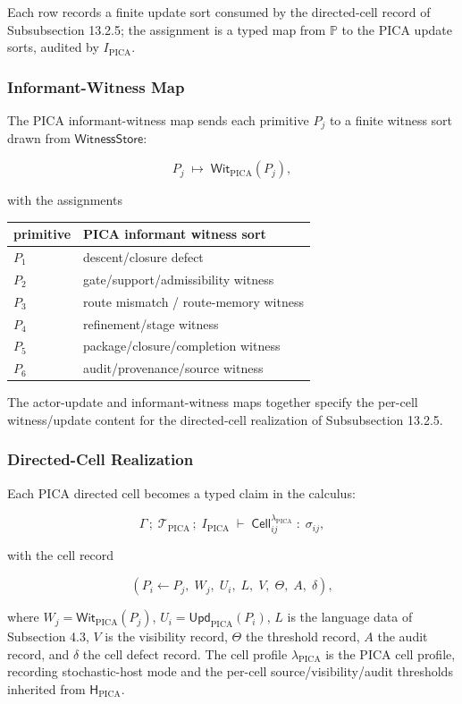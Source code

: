 \documentclass[11pt]{article}
\theoremstyle{definition}
\begin{document}
Each row records a finite update sort consumed by the directed-cell record of Subsubsection 13.2.5; the assignment is a typed map from \(\mathbb P\) to the PICA update sorts, audited by \(I_{\mathrm{PICA}}\).

\subsubsection{Informant-Witness Map}

The PICA informant-witness map sends each primitive \(P_j\) to a finite witness sort drawn from \(\mathsf{WitnessStore}\):

\[
P_j\;\longmapsto\;\mathsf{Wit}_{\mathrm{PICA}}(P_j),
\]

with the assignments

\begin{longtable}[]{@{}ll@{}}
\toprule
primitive & PICA informant witness sort\tabularnewline
\midrule
\endhead
\(P_1\) & descent/closure defect\tabularnewline
\(P_2\) & gate/support/admissibility witness\tabularnewline
\(P_3\) & route mismatch / route-memory witness\tabularnewline
\(P_4\) & refinement/stage witness\tabularnewline
\(P_5\) & package/closure/completion witness\tabularnewline
\(P_6\) & audit/provenance/source witness\tabularnewline
\bottomrule
\end{longtable}

The actor-update and informant-witness maps together specify the per-cell witness/update content for the directed-cell realization of Subsubsection 13.2.5.

\subsubsection{Directed-Cell Realization}

Each PICA directed cell becomes a typed claim in the calculus:

\[
\Gamma\,;\;\mathcal T_{\mathrm{PICA}}\,;\;I_{\mathrm{PICA}}\;\vdash\;\mathsf{Cell}_{ij}^{\lambda_{\mathrm{PICA}}}\;:\;\sigma_{ij},
\]

with the cell record

\[
(P_i\leftarrow P_j,\;W_j,\;U_i,\;L,\;V,\;\Theta,\;A,\;\delta),
\]

where \(W_j=\mathsf{Wit}_{\mathrm{PICA}}(P_j)\), \(U_i=\mathsf{Upd}_{\mathrm{PICA}}(P_i)\), \(L\) is the language data of Subsection 4.3, \(V\) is the visibility record, \(\Theta\) the threshold record, \(A\) the audit record, and \(\delta\) the cell defect record. The cell profile \(\lambda_{\mathrm{PICA}}\) is the PICA cell profile, recording stochastic-host mode and the per-cell source/visibility/audit thresholds inherited from \(\mathsf H_{\mathrm{PICA}}\).
\end{document}
